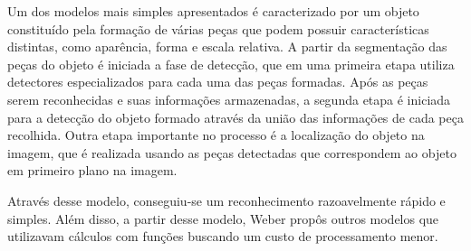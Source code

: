 Um dos modelos mais simples apresentados é caracterizado por um objeto constituído pela formação de várias peças que podem possuir características distintas, como aparência, forma e escala relativa. A partir da segmentação das peças do objeto é iniciada a fase de detecção, que em uma primeira etapa utiliza detectores especializados para cada uma das peças formadas. Após as peças serem reconhecidas e suas informações armazenadas, a segunda etapa é iniciada para a detecção do objeto formado através da união das informações de cada peça recolhida. Outra etapa importante no processo é a localização do objeto na imagem, que é realizada usando as peças detectadas que correspondem ao objeto em primeiro plano na imagem.

Através desse modelo, conseguiu-se um reconhecimento razoavelmente rápido e simples. Além disso, a partir desse modelo, Weber propôs outros modelos que utilizavam cálculos com funções buscando um custo de processamento menor.
